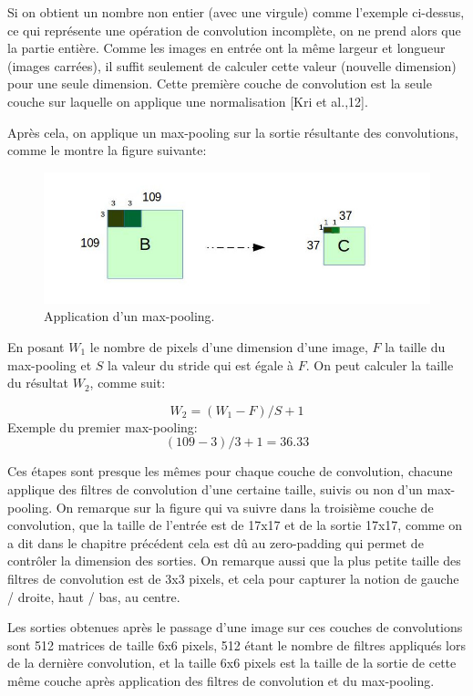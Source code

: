 	Si on obtient un nombre non entier (avec une virgule) comme l'exemple ci-dessus, ce qui représente une opération de convolution incomplète, on ne prend alors que la partie entière. Comme les images en entrée ont la même largeur et longueur (images carrées), il suffit seulement de calculer cette valeur (nouvelle dimension) pour une seule dimension.
	Cette première couche de convolution est la seule couche sur laquelle on applique une normalisation [Kri et al.,12].
	
	Après cela, on applique un max-pooling sur la sortie résultante des convolutions, comme le montre la figure suivante:

\begin{figure}[H]
	\centering
		\includegraphics[width=7in]{Figures/pool.jpg}
	\caption[An Electron]{Application d'un max-pooling.}
	\label{fig:Electron}
\end{figure}

	En posant $W_{1}$ le nombre de pixels d'une dimension d'une image, $F$ la taille du max-pooling et $S$ la valeur du stride qui est égale à $F$. On peut calculer la taille du résultat $W_{2}$, comme suit:

$$W_{2} = (W_{1} - F )/S + 1$$
Exemple du premier max-pooling: $$(109 - 3)/3 +1 = 36.33$$

	Ces étapes sont presque les mêmes pour chaque couche de convolution, chacune applique des filtres de convolution d'une certaine taille, suivis ou non d'un max-pooling. On remarque sur la figure qui va suivre dans la troisième couche de convolution, que la taille de l'entrée est de 17x17 et de la sortie 17x17, comme on a dit dans le chapitre précédent cela est dû au zero-padding qui permet de contrôler la dimension des sorties. On remarque aussi que la plus petite taille des filtres de convolution est de 3x3 pixels, et cela pour capturer la notion de gauche / droite, haut / bas, au centre.

	Les sorties obtenues après le passage d'une image sur ces couches de convolutions sont 512 matrices de taille 6x6 pixels, 512 étant le nombre de filtres appliqués lors de la dernière convolution, et la taille 6x6 pixels est la taille de la sortie de cette même couche après application des filtres de convolution et du max-pooling.

